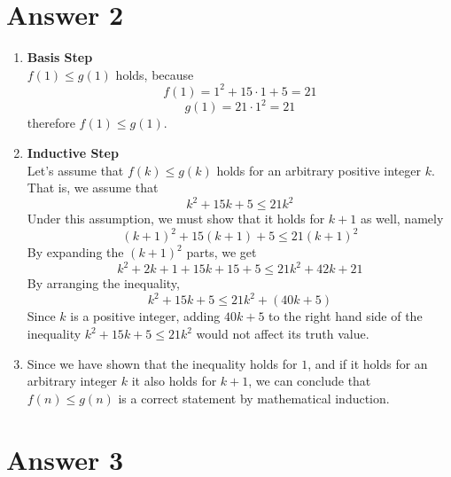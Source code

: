 \documentclass[12pt]{article}
\begin{document}
\section*{Answer 2}
\begin{enumerate}
    \item \textbf{Basis Step} \\
    $f(1) \leq g(1)$ holds, because $$f(1) = 1^2 + 15 \cdot 1 + 5 = 21$$ $$g(1)=21 \cdot 1^2 = 21$$ therefore $f(1) \leq g(1)$.
    \item \textbf{Inductive Step} \\
    Let's assume that $f(k) \leq g(k)$ holds for an arbitrary positive integer $k$. That is, we assume that $$ k^2 + 15k+5 \leq 21k^2 $$
    Under this assumption, we must show that it holds for $k+1$ as well, namely $$ (k+1)^2 + 15(k+1)+5 \leq 21(k+1)^2 $$ 
    By expanding the $(k+1)^2$ parts, we get $$ k^2 + 2k + 1 + 15k + 15 +5 \leq 21k^2 + 42k + 21 $$ 
    By arranging the inequality, $$ k^2 + 15k +5 \leq 21k^2 + ( 40k + 5 )$$ 
    Since $k$ is a positive integer, adding $40k+5$ to the right hand side of the inequality $ k^2 + 15k+5 \leq 21k^2 $ would not affect its truth value. 
    \item Since we have shown that the inequality holds for $1$, and if it holds for an arbitrary integer $k$ it also holds for $k+1$, we can conclude that $f(n) \leq g(n)$ is a correct statement by mathematical induction.
    
\end{enumerate}

\section*{Answer 3}
\end{document}
